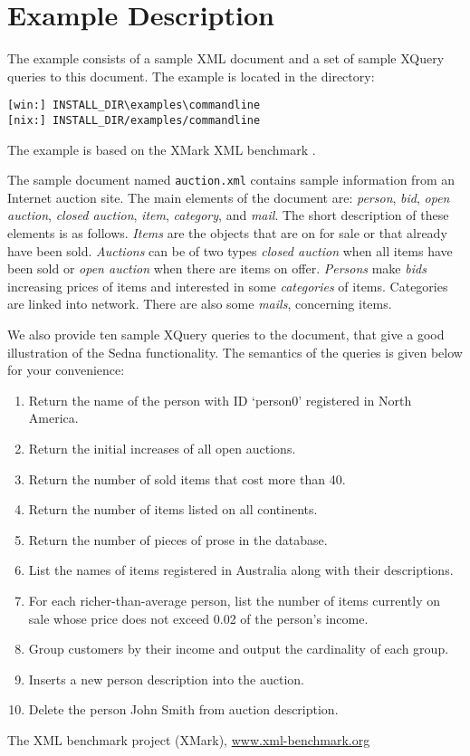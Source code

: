 \documentclass[a4paper,12pt]{article}
\begin{document}
\section{Example Description}
\label{sec:example-description}

The example consists of a sample XML document and a set of sample XQuery queries
to this document. The example is located in the directory:
\begin{verbatim}
[win:] INSTALL_DIR\examples\commandline
[nix:] INSTALL_DIR/examples/commandline
\end{verbatim}
The example is based on the XMark XML benchmark \cite{xmark}.

The sample document named \verb!auction.xml! contains sample information from an
Internet auction site. The main elements of the document are: \emph{person},
\emph{bid}, \emph{open auction}, \emph{closed auction}, \emph{item},
\emph{category}, and \emph{mail}. The short description of these elements is as
follows. \emph{Items} are the objects that are on for sale or that already have
been sold. \emph{Auctions} can be of two types \emph{closed auction} when all
items have been sold or \emph{open auction} when there are items on offer.
\emph{Persons} make \emph{bids} increasing prices of items and interested in
some \emph{categories} of items. Categories are linked into network. There are
also some \emph{mails}, concerning items.

We also provide ten sample XQuery queries to the document, that give a good
illustration of the Sedna functionality. The semantics of the queries is given
below for your convenience:

\begin{enumerate}
\item Return the name of the person with ID `person0' registered in North
 America.
\item Return the initial increases of all open auctions.
\item Return the number of sold items that cost more than 40.
\item Return the number of items listed on all continents.
\item Return the number of pieces of prose in the database.
\item List the names of items registered in Australia along with their
 descriptions.
\item For each richer-than-average person, list the number of items currently
 on sale whose price does not exceed 0.02 of the person's income.
\item Group customers by their income and output the cardinality of each group.
\item Inserts a new person description into the auction.
\item Delete the person John Smith from auction description.
\end{enumerate}

\begin{thebibliography}{9}
 The XML benchmark project (XMark), \url{www.xml-benchmark.org}
\end{thebibliography}
\end{document}
